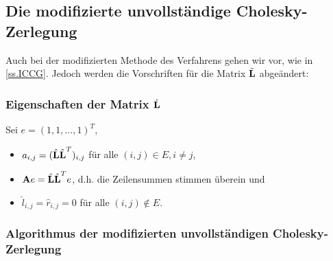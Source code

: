 \subsection{Die modifizierte unvollständige Cholesky-Zerlegung}\label{ss.Modifizierte Cholesky}

Auch bei der modifizierten Methode des Verfahrens gehen wir vor, wie in \autoref{ss.ICCG}. Jedoch werden die Vorschriften für die Matrix $\tilde{{\textbf{L}}}$ abgeändert:

\subsubsection{Eigenschaften der Matrix $\hat{{\textbf{L}}}$}\label{sss.Eigenschaften L MCZ}

Sei $e = (1,1,...,1)^{T}$,

\begin{itemize}
\item $a_{i,j} = (\hat{{\textbf{L}}} \hat{{\textbf{L}}}^{T})_{i,j}$ für alle $(i,j) \in E, i \ne j$,
\item ${\textbf{A}} e = \hat{{\textbf{L}}} \hat{{\textbf{L}}}^{T} e$, d.h. die Zeilensummen stimmen überein und
\item $\hat l_{i,j} = \hat r_{i,j} = 0$ für alle $(i,j) \notin E$.
\end{itemize}

\subsubsection{Algorithmus der modifizierten unvollständigen Cholesky-Zerlegung}\label{sss.Algorithmus MUCZ}

